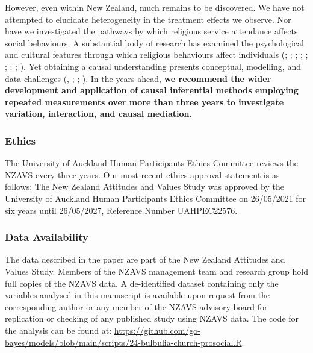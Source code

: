 \documentclass[
  single column]{article}
\begin{document}
However, even within New Zealand, much remains to be discovered. We have
not attempted to elucidate heterogeneity in the treatment effects we
observe. Nor have we investigated the pathways by which religious
service attendance affects social behaviours. A substantial body of
research has examined the psychological and cultural features through
which religious behaviours affect individuals
(;
; ;
;
;
;
;
; ). Yet obtaining a causal understanding presents
conceptual, modelling, and data challenges
(,
; ; ). In
the years ahead, \textbf{we recommend the wider development and
application of causal inferential methods employing repeated
measurements over more than three years to investigate variation,
interaction, and causal mediation}.

\newpage{}

\subsubsection{Ethics}\label{ethics}

The University of Auckland Human Participants Ethics Committee reviews
the NZAVS every three years. Our most recent ethics approval statement
is as follows: The New Zealand Attitudes and Values Study was approved
by the University of Auckland Human Participants Ethics Committee on
26/05/2021 for six years until 26/05/2027, Reference Number UAHPEC22576.

\subsubsection{Data Availability}\label{data-availability}

The data described in the paper are part of the New Zealand Attitudes
and Values Study. Members of the NZAVS management team and research
group hold full copies of the NZAVS data. A de-identified dataset
containing only the variables analysed in this manuscript is available
upon request from the corresponding author or any member of the NZAVS
advisory board for replication or checking of any published study using
NZAVS data. The code for the analysis can be found at:
\url{https://github.com/go-bayes/models/blob/main/scripts/24-bulbulia-church-prosocial.R}.
\end{document}
